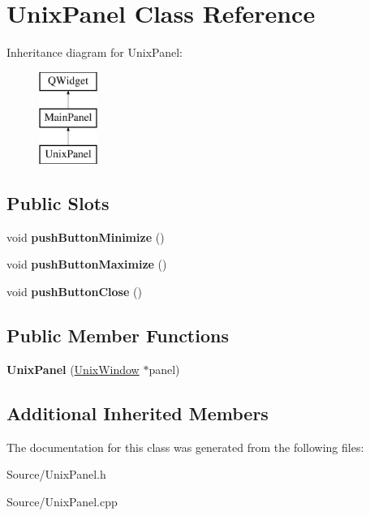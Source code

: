 \hypertarget{class_unix_panel}{}\section{Unix\+Panel Class Reference}
\label{class_unix_panel}
Inheritance diagram for Unix\+Panel\+:\begin{figure}[H]
\begin{center}
\leavevmode
\includegraphics[height=3.000000cm]{class_unix_panel}
\end{center}
\end{figure}
\subsection*{Public Slots}
\begin{DoxyCompactItemize}
\item 
\hypertarget{class_unix_panel_a0dc4c5f1de6f18ee92128876b5375519}{}void {\bfseries push\+Button\+Minimize} ()\label{class_unix_panel_a0dc4c5f1de6f18ee92128876b5375519}

\item 
\hypertarget{class_unix_panel_aa5e9b698eb004c60d7d69703819867a9}{}void {\bfseries push\+Button\+Maximize} ()\label{class_unix_panel_aa5e9b698eb004c60d7d69703819867a9}

\item 
\hypertarget{class_unix_panel_accc383603ba8408e31e26284bc547be7}{}void {\bfseries push\+Button\+Close} ()\label{class_unix_panel_accc383603ba8408e31e26284bc547be7}

\end{DoxyCompactItemize}
\subsection*{Public Member Functions}
\begin{DoxyCompactItemize}
\item 
\hypertarget{class_unix_panel_a857725bbd1874d13f5928bf7eb5649f1}{}{\bfseries Unix\+Panel} (\hyperlink{class_unix_window}{Unix\+Window} $\ast$panel)\label{class_unix_panel_a857725bbd1874d13f5928bf7eb5649f1}

\end{DoxyCompactItemize}
\subsection*{Additional Inherited Members}


The documentation for this class was generated from the following files\+:\begin{DoxyCompactItemize}
\item 
Source/Unix\+Panel.\+h\item 
Source/Unix\+Panel.\+cpp\end{DoxyCompactItemize}
